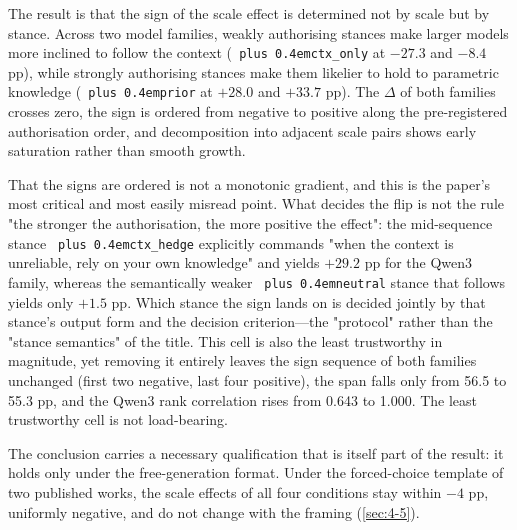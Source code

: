 \documentclass[pdflatex,sn-basic,Numbered]{sn-jnl}
\theoremstyle{thmstyleone}
\theoremstyle{thmstyletwo}
\theoremstyle{thmstylethree}
\DeclareRobustCommand{\code}[1]{\texttt{\spaceskip=0pt plus 0.4em\relax#1}}
\begin{document}
The result is that the sign of the scale effect is determined not by scale but by stance. Across two model families, weakly authorising stances make larger models more inclined to follow the context (\code{ctx\_only} at $-27.3$ and $-8.4$ pp), while strongly authorising stances make them likelier to hold to parametric knowledge (\code{prior} at $+28.0$ and $+33.7$ pp). The $\Delta$ of both families crosses zero, the sign is ordered from negative to positive along the pre-registered authorisation order, and decomposition into adjacent scale pairs shows early saturation rather than smooth growth.

That the signs are ordered is not a monotonic gradient, and this is the paper's most critical and most easily misread point. What decides the flip is not the rule "the stronger the authorisation, the more positive the effect": the mid-sequence stance \code{ctx\_hedge} explicitly commands "when the context is unreliable, rely on your own knowledge" and yields $+29.2$ pp for the Qwen3 family, whereas the semantically weaker \code{neutral} stance that follows yields only $+1.5$ pp. Which stance the sign lands on is decided jointly by that stance's output form and the decision criterion—the "protocol" rather than the "stance semantics" of the title. This cell is also the least trustworthy in magnitude, yet removing it entirely leaves the sign sequence of both families unchanged (first two negative, last four positive), the span falls only from 56.5 to 55.3 pp, and the Qwen3 rank correlation rises from 0.643 to 1.000. The least trustworthy cell is not load-bearing.

The conclusion carries a necessary qualification that is itself part of the result: it holds only under the free-generation format. Under the forced-choice template of two published works, the scale effects of all four conditions stay within $-4$ pp, uniformly negative, and do not change with the framing (\ref{sec:4-5}).
\end{document}
